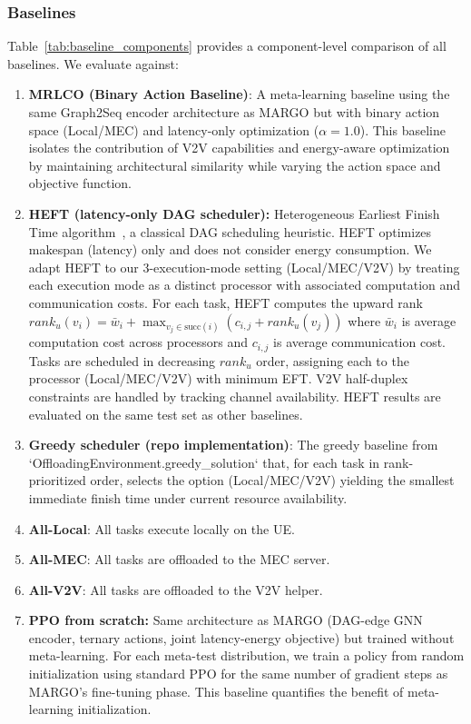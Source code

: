 \documentclass[journal,twoside]{IEEEtran}
\newcommand{\method}{\textsc{MARGO}}
\newcommand{\baseline}{\textsc{MRLCO}}
\begin{document}
\subsubsection{Baselines}

Table~\ref{tab:baseline_components} provides a component-level comparison of all baselines. We evaluate against:

\begin{enumerate}
    \item \textbf{\baseline{} (Binary Action Baseline)}: A meta-learning baseline using the same Graph2Seq encoder architecture as \method{} but with binary action space (Local/MEC) and latency-only optimization ($\alpha=1.0$). This baseline isolates the contribution of V2V capabilities and energy-aware optimization by maintaining architectural similarity while varying the action space and objective function.
    \item \textbf{HEFT (latency-only DAG scheduler):} Heterogeneous Earliest Finish Time algorithm~\cite{topcuoglu2002performance}, a classical DAG scheduling heuristic. HEFT optimizes makespan (latency) only and does not consider energy consumption. We adapt HEFT to our 3-execution-mode setting (Local/MEC/V2V) by treating each execution mode as a distinct processor with associated computation and communication costs. For each task, HEFT computes the upward rank $rank_u(v_i) = \bar{w}_i + \max_{v_j \in \text{succ}(i)} (c_{i,j} + rank_u(v_j))$ where $\bar{w}_i$ is average computation cost across processors and $c_{i,j}$ is average communication cost. Tasks are scheduled in decreasing $rank_u$ order, assigning each to the processor (Local/MEC/V2V) with minimum EFT. V2V half-duplex constraints are handled by tracking channel availability. HEFT results are evaluated on the same test set as other baselines.
    \item \textbf{Greedy scheduler (repo implementation)}: The greedy baseline from `OffloadingEnvironment.greedy_solution` that, for each task in rank-prioritized order, selects the option (Local/MEC/V2V) yielding the smallest immediate finish time under current resource availability.
    \item \textbf{All-Local}: All tasks execute locally on the UE.
    \item \textbf{All-MEC}: All tasks are offloaded to the MEC server.
    \item \textbf{All-V2V}: All tasks are offloaded to the V2V helper.
    \item \textbf{PPO from scratch:} Same architecture as \method{} (DAG-edge GNN encoder, ternary actions, joint latency-energy objective) but trained without meta-learning. For each meta-test distribution, we train a policy from random initialization using standard PPO for the same number of gradient steps as \method{}'s fine-tuning phase. This baseline quantifies the benefit of meta-learning initialization.
\end{enumerate}
\end{document}

